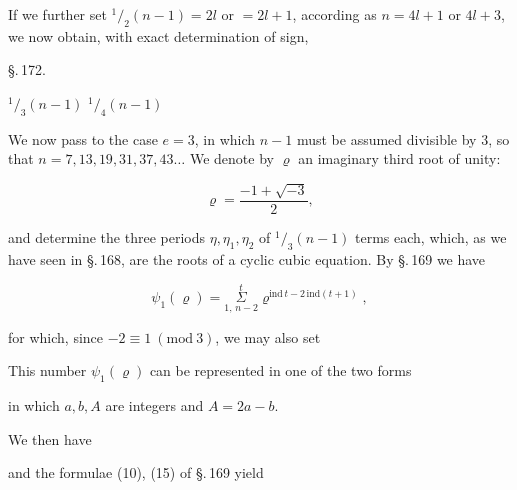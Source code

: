 
If we further set ${}^1/_2 (n - 1) = 2l$ or $= 2l + 1$, according as
$n = 4l + 1$ or $4l + 3$, we now obtain, with
exact determination of sign,


\begin{center}
\S.\,172.
\end{center}

\begin{center}
 ${}^1/_3 (n - 1)$  ${}^1/_4 (n - 1)$ 
\end{center}

We now pass to the case $e = 3$, in which $n - 1$
must be assumed divisible by 3, so that $n = 7, 13, 19,
31, 37, 43 \ldots$ We denote by $\varrho$ an imaginary third
root of unity:

\[ \varrho = \frac{-1 + \sqrt{-3}}{2}, \]

and determine the three periods $\eta, \eta_1, \eta_2$ of ${}^1/_3 (n - 1)$
terms each, which, as we have seen in \S.\,168, are the roots
of a cyclic cubic equation. By \S.\,169 we have

\[ \psi_1(\varrho) = \overset{t}{\underset{1,\, n - 2}{\Sigma}} \varrho^{\mathrm{ind}\, t - 2\, \mathrm{ind}(t + 1)}, \]

for which, since $-2 \equiv 1 \ (\mathrm{mod}\ 3)$, we may also set


This number $\psi_1(\varrho)$ can be represented in one of the two
forms


in which $a, b, A$ are integers and $A = 2a - b$.

We then have


and the formulae (10), (15) of \S.\,169 yield


